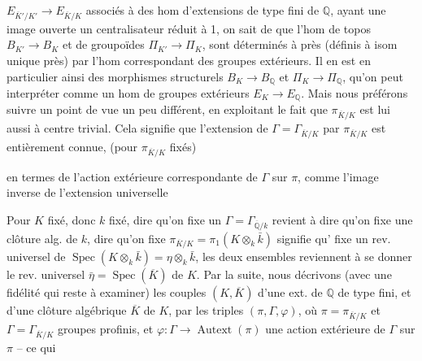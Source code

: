 \documentclass[11pt,a4paper]{article}
\begin{document}
$E_{\overline{K}'/K'} \to E_{\overline{K}/K}$ associés à des hom  d'extensions de type fini de $\mathbb{Q}$, ayant une image ouverte  un centralisateur réduit à 1, on sait de  que l'hom de topos $B_{K'} \to B_K$ et de groupoïdes $\Pi_{K'} \to \Pi_K$, sont déterminés à  \ill{} près (définis à isom unique près) par l'hom correspondant des groupes extérieurs. Il en est en particulier ainsi des morphismes structurels $B_K \to B_{\mathbb{Q}}$ et $\Pi_K \to \Pi_{\mathbb{Q}}$, qu'on peut interpréter  comme un hom de groupes  extérieurs $E_K \to E_{\mathbb{Q}}$. Mais nous préférons suivre un point de vue un peu différent, en exploitant le fait que $\pi_{\overline{K}/K}$ est lui aussi à centre trivial. Cela signifie que l'extension de $\Gamma = \Gamma_{\overline{K}/K}$ par $\pi_{\overline{K}/K}$ est entièrement connue,  (pour $\pi_{\overline{K}/K}$  fixés)

en termes de \struck{\ill{}} l'action extérieure correspondante de $\Gamma$ sur $\pi$, comme l'image inverse de l'extension universelle


Pour $K$ fixé, donc $k$ fixé, dire qu'on fixe un $\Gamma = \Gamma_{\overline{\mathbb{Q}}/k}$ revient à dire qu'on fixe une clôture alg. de $k$, dire qu'on fixe  $\pi_{\overline{K}/K} = \pi_1(K \otimes_k \bar k)$ signifie qu' fixe un rev. universel de $\operatorname{Spec}(K \otimes_k \bar k) = \eta \otimes_k \bar k$,  les deux ensembles reviennent à se donner le rev. universel  $\bar\eta = \operatorname{Spec}(\overline{K})$ de $K$. Par la suite, nous décrivons (avec une fidélité qui reste à examiner) les couples $(K, \overline{K})$ d'une ext.  de $\mathbb{Q}$ de type fini, et d'une clôture algébrique $\overline{K}$ de $K$, par les triples $(\pi, \Gamma, \varphi)$, où $\pi = \pi_{\overline{K}/K}$ et $\Gamma = \Gamma_{\overline{K}/K}$  groupes profinis, et $\varphi : \Gamma \to \operatorname{Autext}(\pi)$ une action extérieure de $\Gamma$ sur $\pi$ -- ce qui
\end{document}
